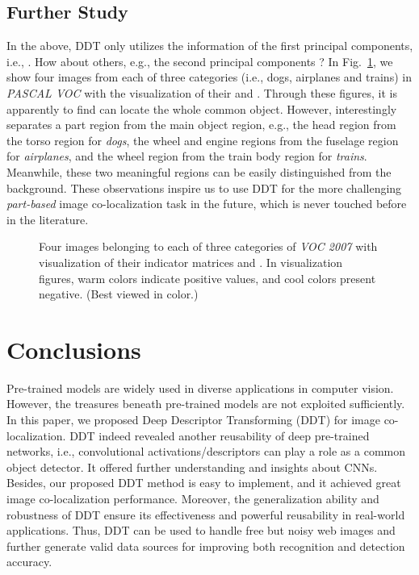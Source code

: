 \documentclass[twocolumn]{svjour3}          \smartqed  \usepackage{graphicx}
\begin{document}
\subsection{Further Study}\label{sec:future}

In the above, DDT only utilizes the information of the first principal components, i.e., . How about others, e.g., the second principal components ? In Fig.~\ref{fig:dog}, we show four images from each of three categories (i.e., dogs, airplanes and trains) in \emph{PASCAL VOC} with the visualization of their  and . Through these figures, it is apparently to find  can locate the whole common object. However,  interestingly separates a part region from the main object region, e.g., the head region from the torso region for \textit{dogs}, the wheel and engine regions from the fuselage region for \textit{airplanes}, and the wheel region from the train body region for \textit{trains}. Meanwhile, these two meaningful regions can be easily distinguished from the background. These observations inspire us to use DDT for the more challenging \emph{part-based} image co-localization task in the future, which is never touched before in the literature. 

\begin{figure}[t]
 \centering


 \caption{Four images belonging to each of three categories of \emph{VOC 2007} with visualization of their indicator matrices  and . In visualization figures, warm colors indicate positive values, and cool colors present negative. (Best viewed in color.)} \label{fig:dog}
\end{figure}

\section{Conclusions}\label{sec:conc}

Pre-trained models are widely used in diverse applications in computer vision. However, the treasures beneath pre-trained models are not exploited sufficiently. In this paper, we proposed Deep Descriptor Transforming (DDT) for image co-localization. DDT indeed revealed another reusability of deep pre-trained networks, i.e., convolutional activations/descriptors can play a role as a common object detector. It offered further understanding and insights about CNNs. Besides, our proposed DDT method is easy to implement, and it achieved great image co-localization performance. Moreover, the generalization ability and robustness of DDT ensure its effectiveness and powerful reusability in real-world applications. Thus, DDT can be used to handle free but noisy web images and further generate valid data sources for improving both recognition and detection accuracy.
\end{document}

